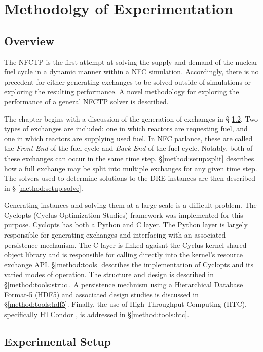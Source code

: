 \chapter{Methodolgy of Experimentation}\label{ch:method}

\section{Overview}

The NFCTP is the first attempt at solving the supply and demand of the nuclear
fuel cycle in a dynamic manner within a NFC simulation. Accordingly, there is no
precedent for either generating exchanges to be solved outside of simulations or
exploring the resulting performance. A novel methodology for exploring the
performance of a general NFCTP solver is described.

The chapter begins with a discussion of the generation of exchanges in \S
\ref{method:setup}. Two types of exchanges are included: one in which reactors
are requesting fuel, and one in which reactors are supplying used fuel. In NFC
parlance, these are called the \textit{Front End} of the fuel cycle and
\textit{Back End} of the fuel cycle. Notably, both of these exchanges can occur
in the same time step. \S \ref{method:setup:split} describes how a full exchange
may be split into multiple exchanges for any given time step. The solvers used
to determine solutions to the DRE instances are then described in \S
\ref{method:setup:solve}.

Generating instances and solving them at a large scale is a difficult
problem. The Cyclopts (Cyclus Optimization Studies) framework was implemented
for this purpose. Cyclopts has both a Python and C layer. The Python layer is
largely responsible for generating exchanges and interfacing with an associated
persistence mechanism. The C layer is linked agaisnt the Cyclus kernel shared
object library and is responsible for calling directly into the kernel's
resource exchange API. \S \ref{method:tools} describes the implementation of
Cyclopts and its varied modes of operation. The structure and design is
described in \S \ref{method:tools:struc}. A persistence mechnism using a
Hierarchical Database Format-5 (HDF5) \cite{hdf5} and associated design studies
is discussed in \S \ref{method:tools:hdf5}. Finally, the use of High Throughput
Computing (HTC), specifically HTCondor \cite{condor-practice}, is addressed in
\S \ref{method:tools:htc}.

\section{Experimental Setup}\label{method:setup}

